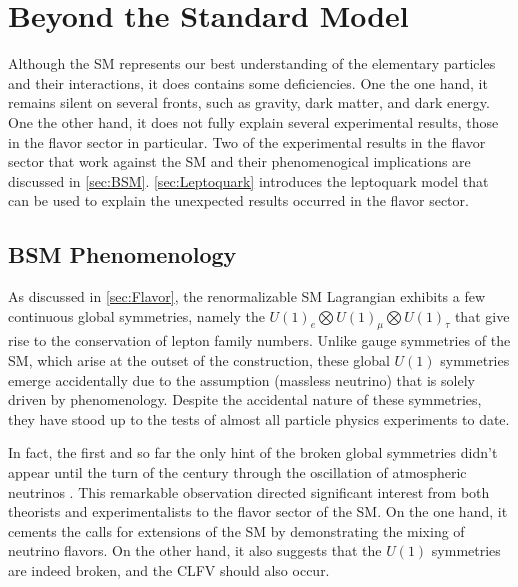 \chapter{Beyond the Standard Model}
\label{chap:BSM}

Although the \ac{SM} represents our best understanding of the elementary particles and their interactions, it does contains some deficiencies. One the one hand, it remains silent on several fronts, such as gravity, dark matter, and dark energy. One the other hand, it does not fully explain several experimental results, those in the flavor sector in particular. Two of the experimental results in the flavor sector that work against the \ac{SM} and their phenomenogical implications are discussed in \autoref{sec:BSM}. \autoref{sec:Leptoquark} introduces the leptoquark model that can be used to explain the unexpected results occurred in the flavor sector.

\section{BSM Phenomenology}
\label{sec:BSM}

As discussed in \autoref{sec:Flavor}, the renormalizable \ac{SM} Lagrangian exhibits a few continuous global symmetries, namely the $U(1)_{e}\bigotimes U(1)_{\mu}\bigotimes U(1)_{\tau}$ that give rise to the conservation of lepton family numbers. Unlike gauge symmetries of the \ac{SM}, which arise at the outset of the construction, these global $U(1)$ symmetries emerge accidentally due to the assumption (massless neutrino) that is solely driven by phenomenology. Despite the accidental nature of these symmetries, they have stood up to the tests of almost all particle physics experiments to date.  

In fact, the first and so far the only hint of the broken global symmetries didn't appear until the turn of the century through the oscillation of atmospheric neutrinos \cite{Super-Kamiokande:1998kpq,SNO:2002tuh}. This remarkable observation directed significant interest from both theorists and experimentalists to the flavor sector of the \ac{SM}. On the one hand, it cements the calls for extensions of the \ac{SM} by demonstrating the mixing of neutrino flavors. On the other hand, it also suggests that the $U(1)$ symmetries are indeed broken, and the \ac{CLFV} should also occur. 

